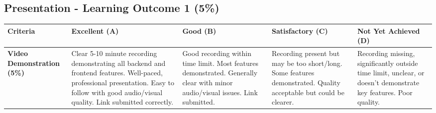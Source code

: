 \documentclass{article}
\begin{document}
\begin{landscape}
\begin{tabular}{|p{5cm}|p{4cm}|p{4cm}|p{4cm}|p{4cm}|}
\end{tabular}

\subsection*{Presentation - Learning Outcome 1 (5\%)}

\begin{tabular}{|p{5cm}|p{4cm}|p{4cm}|p{4cm}|p{4cm}|}
\hline
\textbf{Criteria} & \textbf{Excellent (A)} & \textbf{Good (B)} & \textbf{Satisfactory (C)} & \textbf{Not Yet Achieved (D)} \\ \hline

\textbf{Video Demonstration (5\%)} & 
Clear 5-10 minute recording demonstrating all backend and frontend features. Well-paced, professional presentation. Easy to follow with good audio/visual quality. Link submitted correctly. & 
Good recording within time limit. Most features demonstrated. Generally clear with minor audio/visual issues. Link submitted. & 
Recording present but may be too short/long. Some features demonstrated. Quality acceptable but could be clearer. & 
Recording missing, significantly outside time limit, unclear, or doesn't demonstrate key features. Poor quality. \\ \hline

\end{tabular}
\end{landscape}
\restoregeometry
\end{document}

